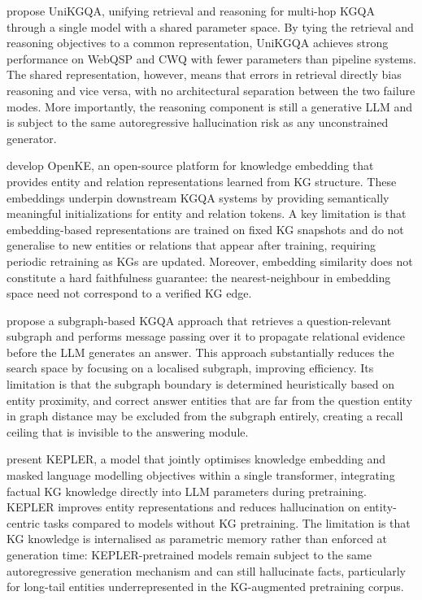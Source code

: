 \citet{jiang2022unikgqa} propose UniKGQA, unifying retrieval and reasoning for multi-hop KGQA through a single model with a shared parameter space. By tying the retrieval and reasoning objectives to a common representation, UniKGQA achieves strong performance on WebQSP and CWQ with fewer parameters than pipeline systems. The shared representation, however, means that errors in retrieval directly bias reasoning and vice versa, with no architectural separation between the two failure modes. More importantly, the reasoning component is still a generative LLM and is subject to the same autoregressive hallucination risk as any unconstrained generator.

\citet{sun2018openke} develop OpenKE, an open-source platform for knowledge embedding that provides entity and relation representations learned from KG structure. These embeddings underpin downstream KGQA systems by providing semantically meaningful initializations for entity and relation tokens. A key limitation is that embedding-based representations are trained on fixed KG snapshots and do not generalise to new entities or relations that appear after training, requiring periodic retraining as KGs are updated. Moreover, embedding similarity does not constitute a hard faithfulness guarantee: the nearest-neighbour in embedding space need not correspond to a verified KG edge.

\citet{zhang2022subgraph} propose a subgraph-based KGQA approach that retrieves a question-relevant subgraph and performs message passing over it to propagate relational evidence before the LLM generates an answer. This approach substantially reduces the search space by focusing on a localised subgraph, improving efficiency. Its limitation is that the subgraph boundary is determined heuristically based on entity proximity, and correct answer entities that are far from the question entity in graph distance may be excluded from the subgraph entirely, creating a recall ceiling that is invisible to the answering module.

\citet{wang2021kepler} present KEPLER, a model that jointly optimises knowledge embedding and masked language modelling objectives within a single transformer, integrating factual KG knowledge directly into LLM parameters during pretraining. KEPLER improves entity representations and reduces hallucination on entity-centric tasks compared to models without KG pretraining. The limitation is that KG knowledge is internalised as parametric memory rather than enforced at generation time: KEPLER-pretrained models remain subject to the same autoregressive generation mechanism and can still hallucinate facts, particularly for long-tail entities underrepresented in the KG-augmented pretraining corpus.

